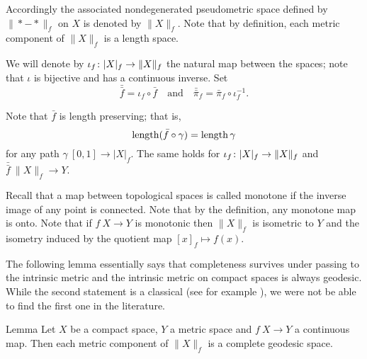 \documentclass{article}
\begin{document}
Accordingly the associated nondegenerated  pseudometric space defined by $\|{*}-{*}\|_f$ on $X$ 
is denoted by $\|X\|_f$. 
Note that by definition, each metric component of $\|X\|_f$ is a length space.

\begin{wrapfigure}{r}{33 mm}
\end{wrapfigure}

We will denote by $\iota_f\:|X|_f\zz\to \|X\|_f$ the natural map between the spaces;
note that $\iota$ is bijective and has a continuous inverse.
Set 
\[
\bar{\bar f}=\iota_f\circ\bar f
\quad\text{and}\quad
\bar{\bar\pi}_f=\bar\pi_f\circ\iota_f^{-1}.
\]


Note that  $\bar f$
is length preserving;
that is,
\[\mathop{\rm length}\nolimits(\bar f\circ\gamma)=\mathop{\rm length}\nolimits\gamma\]
for any path $\gamma\:[0,1]\to |X|_f$.
The same holds for  $\iota_f\:|X|_f\zz\to \|X\|_f$ and $\bar{\bar f}\:\|X\|_f\to Y$.

Recall that a map between topological spaces is called monotone if the inverse image of any point is connected.
Note that by the definition, any monotone map is onto.
Note that if $f\:X\to Y$ is monotonic then $\|X\|_f$ is isometric to $Y$
and the isometry induced by the quotient map $[x]_f\mapsto f(x)$.

The following lemma essentially says that completeness survives under passing to the intrinsic metric
and the intrinsic metric on compact spaces is always geodesic.
While the second statement is a classical (see for example \cite[II-\S8 Thm. 3]{KF}), 
we were not be able to find the first one in the literature.

\begin{thm}{Lemma}\label{lem:geospace}
Let $X$ be a compact %
space, $Y$ a metric space and $f\:X\to Y$ a continuous map. 
Then each metric component of $\|X\|_f$ is a complete geodesic space.
\end{thm}
\end{document}
